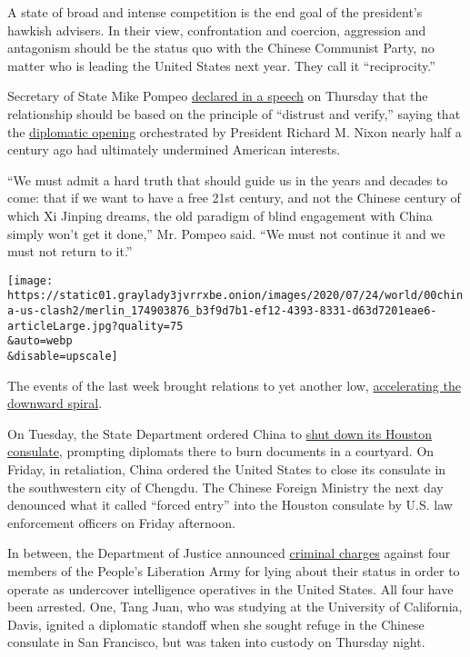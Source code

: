 A state of broad and intense competition is the end goal of the
president's hawkish advisers. In their view, confrontation and coercion,
aggression and antagonism should be the status quo with the Chinese
Communist Party, no matter who is leading the United States next year.
They call it ``reciprocity.''

Secretary of State Mike Pompeo
\href{https://www.state.gov/communist-china-and-the-free-worlds-future/}{declared
in a speech} on Thursday that the relationship should be based on the
principle of ``distrust and verify,'' saying that the
\href{https://www.nytimes3xbfgragh.onion/1972/02/24/archives/nixon-talks-further-with-chou-and-drives-to-view-great-wall-wider.html}{diplomatic
opening} orchestrated by President Richard M. Nixon nearly half a
century ago had ultimately undermined American interests.

``We must admit a hard truth that should guide us in the years and
decades to come: that if we want to have a free 21st century, and not
the Chinese century of which Xi Jinping dreams, the old paradigm of
blind engagement with China simply won't get it done,'' Mr. Pompeo said.
``We must not continue it and we must not return to it.''

\texttt{[image: https://static01.graylady3jvrrxbe.onion/images/2020/07/24/world/00china-us-clash2/merlin\_174903876\_b3f9d7b1-ef12-4393-8331-d63d7201eae6-articleLarge.jpg?quality=75\\\&auto=webp\\\&disable=upscale]}

The events of the last week brought relations to yet another low,
\href{https://www.nytimes3xbfgragh.onion/2020/07/14/world/asia/cold-war-china-us.html}{accelerating
the downward spiral}.

On Tuesday, the State Department ordered China to
\href{https://www.nytimes3xbfgragh.onion/2020/07/22/world/asia/us-china-houston-consulate.html}{shut
down its Houston consulate}, prompting diplomats there to burn documents
in a courtyard. On Friday, in retaliation, China ordered the United
States to close its consulate in the southwestern city of Chengdu. The
Chinese Foreign Ministry the next day denounced what it called ``forced
entry'' into the Houston consulate by U.S. law enforcement officers on
Friday afternoon.

In between, the Department of Justice announced
\href{https://www.justice.gov/opa/pr/researchers-charged-visa-fraud-after-lying-about-their-work-china-s-people-s-liberation-army}{criminal
charges} against four members of the People's Liberation Army for lying
about their status in order to operate as undercover intelligence
operatives in the United States. All four have been arrested. One, Tang
Juan, who was studying at the University of California, Davis, ignited a
diplomatic standoff when she sought refuge in the Chinese consulate in
San Francisco, but was taken into custody on Thursday night.

